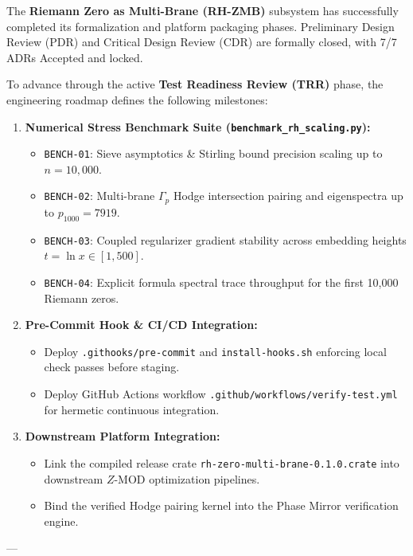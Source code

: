 \documentclass[11pt,a4paper]{article}
\theoremstyle{definition}
\theoremstyle{remark}
\begin{document}
The \textbf{Riemann Zero as Multi-Brane (RH-ZMB)} subsystem has successfully completed its formalization and platform packaging phases. Preliminary Design Review (PDR) and Critical Design Review (CDR) are formally closed, with 7/7 ADRs Accepted and locked.

To advance through the active \textbf{Test Readiness Review (TRR)} phase, the engineering roadmap defines the following milestones:
\begin{enumerate}
    \item \textbf{Numerical Stress Benchmark Suite (\texttt{benchmark\_rh\_scaling.py}):}
    \begin{itemize}
        \item \texttt{BENCH-01}: Sieve asymptotics \& Stirling bound precision scaling up to $n = 10,000$.
        \item \texttt{BENCH-02}: Multi-brane $\Gamma_p$ Hodge intersection pairing and eigenspectra up to $p_{1000} = 7919$.
        \item \texttt{BENCH-03}: Coupled regularizer gradient stability across embedding heights $t = \ln x \in [1, 500]$.
        \item \texttt{BENCH-04}: Explicit formula spectral trace throughput for the first 10,000 Riemann zeros.
    \end{itemize}
    \item \textbf{Pre-Commit Hook \& CI/CD Integration:}
    \begin{itemize}
        \item Deploy \texttt{.githooks/pre-commit} and \texttt{install-hooks.sh} enforcing local check passes before staging.
        \item Deploy GitHub Actions workflow \texttt{.github/workflows/verify-test.yml} for hermetic continuous integration.
    \end{itemize}
    \item \textbf{Downstream Platform Integration:}
    \begin{itemize}
        \item Link the compiled release crate \texttt{rh-zero-multi-brane-0.1.0.crate} into downstream $Z\text{-MOD}$ optimization pipelines.
        \item Bind the verified Hodge pairing kernel into the Phase Mirror verification engine.
    \end{itemize}
\end{enumerate}

---
\end{document}
